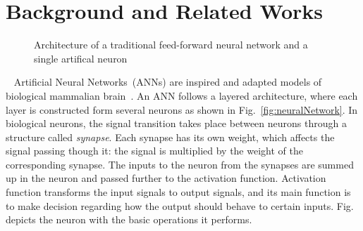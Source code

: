 \section{Background and Related Works}



\begin{figure}[t!]
    \centering
    \caption{Architecture of a traditional feed-forward neural network and a single artifical neuron}
\end{figure}


~\cite{Furber2013}
Artificial Neural Networks~(ANNs) are inspired and adapted models of biological mammalian brain~\cite{}.
An ANN follows a layered architecture, where each layer is constructed form several neurons as shown in Fig.~\ref{fig:neuralNetwork}. 
In biological neurons, the signal transition takes place between neurons through a structure called \emph{synapse}. 
Each synapse has its own weight, which affects the signal passing though it: the signal is multiplied by the weight of the corresponding synapse. The inputs to the neuron from the synapses are summed up in the neuron and passed further to the activation function. Activation function transforms the input signals to output signals, and its main function is to make decision regarding how the output should behave to certain inputs. Fig. depicts the neuron with the basic operations it performs. 

